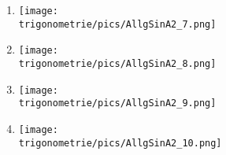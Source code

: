 \documentclass[a4paper,12pt, headsepline, ngerman]{scrartcl}
\theoremstyle{definition}
\begin{document}
\begin{Exercise}[title={Stelle jeweils die Funktionsgleichung vom Typ \(a\cdot \sin\left(bx\right)+d\)\\oder \(a\cdot \cos\left(bx\right)+d\) auf.}, label=allgSinCosA2]
\begin{minipage}{\textwidth}
\begin{minipage}{0.49\textwidth}
\begin{enumerate}[label=\alph*)]
				\item \begin{minipage}{.9\textwidth}
					\texttt{[image: \\trigonometrie/pics/AllgSinA2\_7.png]}\\
				\end{minipage}
				\item \begin{minipage}{.9\textwidth}
					\texttt{[image: \\trigonometrie/pics/AllgSinA2\_8.png]}\\
				\end{minipage}
				\item \begin{minipage}{.9\textwidth}
					\texttt{[image: \\trigonometrie/pics/AllgSinA2\_9.png]}\\
				\end{minipage}
				\item \begin{minipage}{.9\textwidth}
				\texttt{[image: \\trigonometrie/pics/AllgSinA2\_10.png]}\\
				\end{minipage}
			\end{enumerate}
		\end{minipage}
	\end{minipage}
\end{Exercise}
\end{document}
